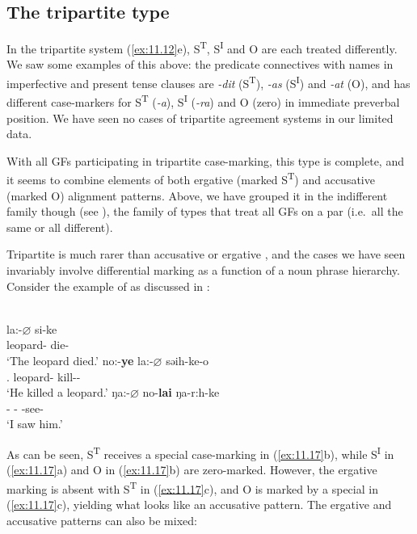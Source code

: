 \documentclass[output=paper]{langsci/langscibook}
\begin{document}
\subsection{The tripartite type}\label{sec:11.5.3}

In the tripartite system (\ref{ex:11.12}e), S\textsuperscript{T}, S\textsuperscript{I} and
O are each treated differently. We saw some examples of this above: the
predicate connectives with names in  imperfective and present
tense clauses are \emph{-dit} (S\textsuperscript{T}), \emph{-as}
(S\textsuperscript{I}) and \emph{-at} (O), and  has different
case-markers for S\textsuperscript{T} (\emph{-a}), S\textsuperscript{I}
(\emph{-ra}) and O (zero) in immediate preverbal position. We have seen no
cases of tripartite agreement systems in our limited data.

With all \glspl{GF} participating in tripartite
case-marking, this  type is complete, and it seems to combine elements
of both ergative (marked S\textsuperscript{T}) and accusative (marked O)
alignment patterns.  Above, we have grouped it in the indifferent family though
(see ), the family of  types that treat all
\glspl{GF} on a par (i.e.\ all the same or all
different).

Tripartite  is much rarer than accusative or ergative 
\citep[40]{Dixon1994}, and the cases we have seen invariably involve
differential marking as a function of a noun phrase  hierarchy. Consider
the example of  as discussed in \textcite{Watters2002}:

\ea%
\label{ex:11.17}  \parencite[66--67]{Watters2002}\\
	\ea
		\gll la:-${\varnothing}$        si-ke\\
			leopard-\Abs{}  die-\Pfv{}\\
		\glt ‘The leopard died.’
	\ex
		\gll no:-\textbf{ye}    la:-${\varnothing}$        səih-ke-o\\
			\Tsg.\Erg{}  leopard-\Abs{}  kill-\Pfv{}-\Tsg{}\\
		\glt ‘He killed a leopard.’
	\ex
		\gll ŋa:-${\varnothing}$    no-\textbf{lai}    ŋa-r:h-ke\\
			\Fsg-\Nom{} \Tsg-\Acc{} \Fsg{}-see-\Pfv{}\\
		\glt ‘I saw him.’
	\z
\z

As can be seen, S\textsuperscript{T} receives a special case-marking in (\ref{ex:11.17}b),
while S\textsuperscript{I} in (\ref{ex:11.17}a) and O in (\ref{ex:11.17}b) are zero-marked. However,
the ergative marking is absent with S\textsuperscript{T} in (\ref{ex:11.17}c), and O is
marked by a special  in (\ref{ex:11.17}c), yielding what looks like an
accusative pattern. The ergative and accusative patterns can also be mixed:
\end{document}
